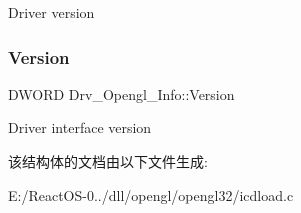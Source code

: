 Driver version \mbox{\label{struct_drv___opengl___info_a6b4d8da0a1b9008510910a884eaef7e2}} 
\subsubsection{\texorpdfstring{Version}{Version}}
{\footnotesize\ttfamily D\+W\+O\+RD Drv\+\_\+\+Opengl\+\_\+\+Info\+::\+Version}

Driver interface version 

该结构体的文档由以下文件生成\+:\begin{DoxyCompactItemize}
\item 
E\+:/\+React\+O\+S-\/0../dll/opengl/opengl32/icdload.\+c\end{DoxyCompactItemize}
